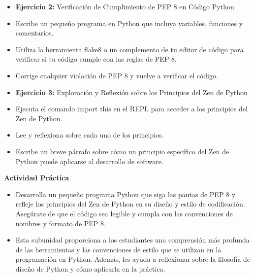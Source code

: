 \documentclass[
  a4paper,
  DIV=11,
  numbers=noendperiod,
  onepage,
  openany]{scrreprt}
\begin{document}
\begin{itemize}
\item
  \textbf{Ejercicio 2:} Verificación de Cumplimiento de PEP 8 en Código
  Python
\item
  Escribe un pequeño programa en Python que incluya variables, funciones
  y comentarios.
\item
  Utiliza la herramienta flake8 o un complemento de tu editor de código
  para verificar si tu código cumple con las reglas de PEP 8.
\item
  Corrige cualquier violación de PEP 8 y vuelve a verificar el código.
\item
  \textbf{Ejercicio 3:} Exploración y Reflexión sobre los Principios del
  Zen de Python
\item
  Ejecuta el comando import this en el REPL para acceder a los
  principios del Zen de Python.
\item
  Lee y reflexiona sobre cada uno de los principios.
\item
  Escribe un breve párrafo sobre cómo un principio específico del Zen de
  Python puede aplicarse al desarrollo de software.
\end{itemize}

\begin{tcolorbox}[enhanced jigsaw, leftrule=.75mm, bottomtitle=1mm, title=\textcolor{quarto-callout-tip-color}{\faLightbulb}\hspace{0.5em}{Tip}, colbacktitle=quarto-callout-tip-color!10!white, coltitle=black, bottomrule=.15mm, colframe=quarto-callout-tip-color-frame, titlerule=0mm, opacityback=0, rightrule=.15mm, toptitle=1mm, opacitybacktitle=0.6, arc=.35mm, breakable, colback=white, toprule=.15mm, left=2mm]

\textbf{Actividad Práctica}

\begin{itemize}
\item
  Desarrolla un pequeño programa Python que siga las pautas de PEP 8 y
  refleje los principios del Zen de Python en su diseño y estilo de
  codificación. Asegúrate de que el código sea legible y cumpla con las
  convenciones de nombres y formato de PEP 8.
\item
  Esta subunidad proporciona a los estudiantes una comprensión más
  profunda de las herramientas y las convenciones de estilo que se
  utilizan en la programación en Python. Además, les ayuda a reflexionar
  sobre la filosofía de diseño de Python y cómo aplicarla en la
  práctica.
\end{itemize}

\end{tcolorbox}
\end{document}
